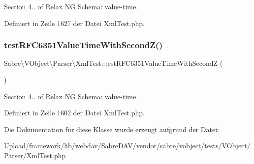 Section 4.. of Relax NG Schema\+: value-\/time. 

Definiert in Zeile 1627 der Datei Xml\+Test.\+php.

\mbox{\label{class_sabre_1_1_v_object_1_1_parser_1_1_xml_test_a607d97acf898c965f0cb4aecf17c5555}} 
\subsubsection{\texorpdfstring{test\+R\+F\+C6351\+Value\+Time\+With\+Second\+Z()}{testRFC6351ValueTimeWithSecondZ()}}
{\footnotesize\ttfamily Sabre\textbackslash{}\+V\+Object\textbackslash{}\+Parser\textbackslash{}\+Xml\+Test\+::test\+R\+F\+C6351\+Value\+Time\+With\+SecondZ (\begin{DoxyParamCaption}{ }\end{DoxyParamCaption})}

Section 4.. of Relax NG Schema\+: value-\/time. 

Definiert in Zeile 1602 der Datei Xml\+Test.\+php.



Die Dokumentation für diese Klasse wurde erzeugt aufgrund der Datei\+:\begin{DoxyCompactItemize}
\item 
Upload/framework/lib/webdav/\+Sabre\+D\+A\+V/vendor/sabre/vobject/tests/\+V\+Object/\+Parser/Xml\+Test.\+php\end{DoxyCompactItemize}
